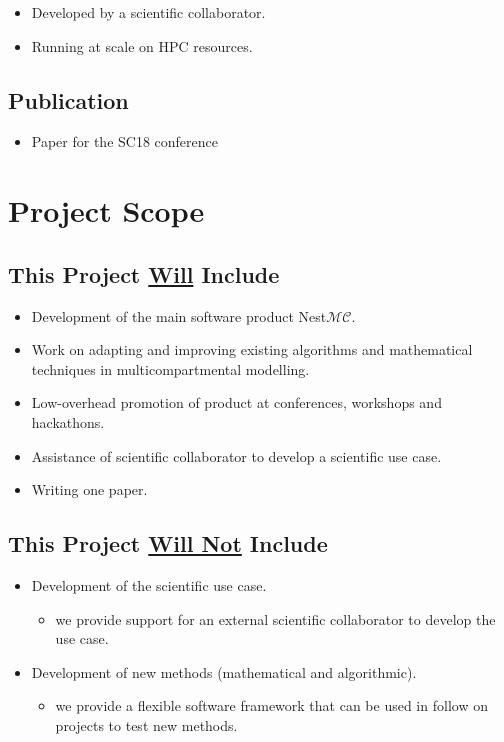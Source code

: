 \documentclass[11pt,a4paper]{article}
\newcommand{\nestmc}[0]{Nest$\mathcal{MC}$\xspace}
\begin{document}
\begin{itemize}
    \item   Developed by a scientific collaborator.
    \item   Running at scale on HPC resources.
\end{itemize}

\subsection{Publication}

\begin{itemize}
    \item   Paper for the SC18 conference
\end{itemize}

\section{Project Scope}
\subsection{This Project \underline{Will} Include}

\begin{itemize}
    \item Development of the main software product \nestmc.
    \item Work on adapting and improving existing algorithms and mathematical techniques in multicompartmental modelling.
    \item Low-overhead promotion of product at conferences, workshops and hackathons.
    \item Assistance of scientific collaborator to develop a scientific use case.
    \item Writing one paper.
\end{itemize}

\subsection{This Project \underline{Will Not} Include}

\begin{itemize}
    \item Development of the scientific use case.
    \begin{itemize}
        \item we provide support for an external scientific collaborator to develop the use case.
    \end{itemize}
    \item Development of new methods (mathematical and algorithmic).
    \begin{itemize}
        \item we provide a flexible software framework that can be used in follow on projects to test new methods.
    \end{itemize}
\end{itemize}
\end{document}
